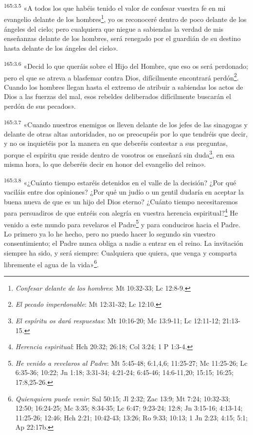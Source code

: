\par
\textsuperscript{165:3.5} «A todos los que habéis tenido el valor de confesar vuestra fe en mi evangelio delante de los hombres\footnote{\textit{Confesar delante de los hombres}: Mt 10:32-33; Lc 12:8-9.}, yo os reconoceré dentro de poco delante de los ángeles del cielo; pero cualquiera que niegue a sabiendas la verdad de mis enseñanzas delante de los hombres, será renegado por el guardián de su destino hasta delante de los ángeles del cielo».

\par
\textsuperscript{165:3.6} «Decid lo que queráis sobre el Hijo del Hombre, que eso os será perdonado; pero el que se atreva a blasfemar contra Dios, difícilmente encontrará perdón\footnote{\textit{El pecado imperdonable}: Mt 12:31-32; Lc 12:10.}. Cuando los hombres llegan hasta el extremo de atribuir a sabiendas los actos de Dios a las fuerzas del mal, esos rebeldes deliberados difícilmente buscarán el perdón de sus pecados».

\par
\textsuperscript{165:3.7} «Cuando nuestros enemigos os lleven delante de los jefes de las sinagogas y delante de otras altas autoridades, no os preocupéis por lo que tendréis que decir, y no os inquietéis por la manera en que deberéis contestar a sus preguntas, porque el espíritu que reside dentro de vosotros os enseñará sin duda\footnote{\textit{El espíritu os dará respuestas}: Mt 10:16-20; Mc 13:9-11; Lc 12:11-12; 21:13-15.}, en esa misma hora, lo que deberéis decir en honor del evangelio del reino».

\par
\textsuperscript{165:3.8} «¿Cuánto tiempo estaréis detenidos en el valle de la decisión? ¿Por qué vaciláis entre dos opiniones? ¿Por qué un judío o un gentil dudaría en aceptar la buena nueva de que es un hijo del Dios eterno? ¿Cuánto tiempo necesitaremos para persuadiros de que entréis con alegría en vuestra herencia espiritual?\footnote{\textit{Herencia espiritual}: Hch 20:32; 26:18; Col 3:24; 1 P 1:3-4.} He venido a este mundo para revelaros el Padre\footnote{\textit{He venido a revelaros al Padre}: Mt 5:45-48; 6:1,4,6; 11:25-27; Mc 11:25-26; Lc 6:35-36; 10:22; Jn 1:18; 3:31-34; 4:21-24; 6:45-46; 14:6-11,20; 15:15; 16:25; 17:8,25-26.} y para conduciros hacia el Padre. Lo primero ya lo he hecho, pero no puedo hacer lo segundo sin vuestro consentimiento; el Padre nunca obliga a nadie a entrar en el reino. La invitación siempre ha sido, y será siempre: Cualquiera que quiera, que venga y comparta libremente el agua de la vida»\footnote{\textit{Quienquiera puede venir}: Sal 50:15; Jl 2:32; Zac 13:9; Mt 7:24; 10:32-33; 12:50; 16:24-25; Mc 3:35; 8:34-35; Lc 6:47; 9:23-24; 12:8; Jn 3:15-16; 4:13-14; 11:25-26; 12:46; Hch 2:21; 10:42-43; 13:26; Ro 9:33; 10:13; 1 Jn 2:23; 4:15; 5:1; Ap 22:17b.}.


